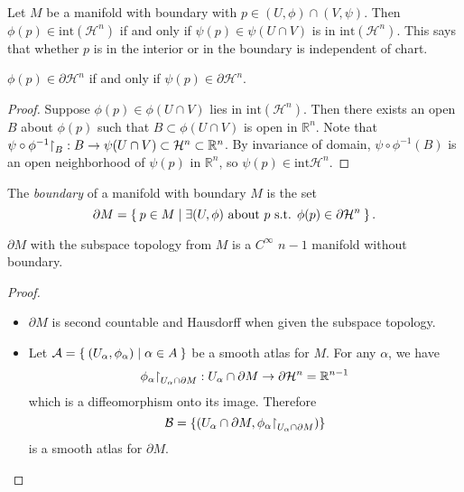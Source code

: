 \begin{prop}
Let $M$ be a manifold with boundary with
$p \in (U, \phi) \cap (V, \psi)$. Then
$\phi(p) \in \mathrm{int}(\mathcal{H}^n)$ if and only if
$\psi(p) \in \psi(U \cap V)$ is in $\mathrm{int}(\mathcal{H}^n)$.
This says that whether $p$ is in the interior or in the boundary is
independent of chart.
\end{prop}
\begin{corol}
$\phi(p) \in \partial \mathcal{H}^n$ if and only if
$\psi(p) \in \partial \mathcal{H}^n$.
\end{corol}

\begin{proof}
Suppose $\phi(p) \in \phi(U \cap V)$ lies in $\mathrm{int}
(\mathcal{H}^n)$. Then there exists an open $B$ about $\phi(p)$ such
that $B \subset \phi(U \cap V)$ is open in $\mathbb{R}^n$. Note that
$\psi \circ \phi^{-1}\mathord{\upharpoonright}_B : B \to \psi(U \cap V) \subset
\mathcal{H}^n \subset \mathbb{R}^n$. By invariance of domain,
$\psi \circ \phi^{-1}(B)$ is an open neighborhood of $\psi(p)$ in
$\mathbb{R}^n$, so $\psi(p) \in \mathrm{int} \mathcal{H}^n$.
\end{proof}

\begin{defn}
The \emph{boundary} of a manifold with boundary $M$ is the set
$$
  \partial M
= \Set{ p \in M |
     \exists (U, \phi)
       \text{ about $p$ s.t. $\phi(p) \in \partial \mathcal{H}^n$}
  }.
$$
\end{defn}

\begin{prop}
$\partial M$ with the subspace topology from $M$ is a $C^\infty$
$n-1$ manifold without boundary.
\end{prop}
\begin{proof}
  \begin{itemize}
    \item{
      $\partial M$ is second countable and Hausdorff when given the
      subspace topology.
    }
    \item{
      Let $\mathcal{A} = \Set{(U_\alpha, \phi_\alpha) | \alpha \in
      A}$ be a smooth atlas for $M$. For any $\alpha$, we have
      $$
        \phi_\alpha\mathord{\upharpoonright}_{U_\alpha \cap \partial M}
      : U_\alpha \cap \partial M \to \partial \mathcal{H}^n
      = \mathbb{R}^{n-1}
      $$
      which is a diffeomorphism onto its image. Therefore
      $$
        \mathcal{B}
      = \{(U_\alpha \cap \partial M,
           \phi_\alpha \mathord{\upharpoonright}_{U_\alpha \cap \partial M})\}
      $$
      is a smooth atlas for $\partial M$.
    }
  \end{itemize}
\end{proof}

